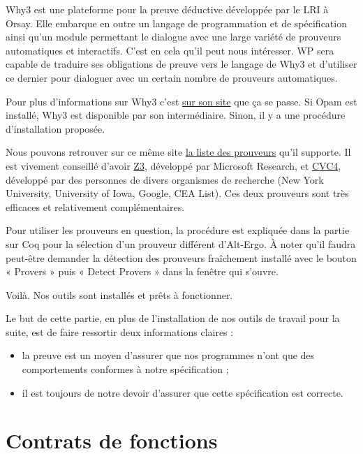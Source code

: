 \documentclass[12pt,francais,]{scrbook}
\providecommand{\tightlist}{%
  \setlength{\itemsep}{0pt}\setlength{\parskip}{0pt}}
\begin{document}
Why3 est une plateforme pour la preuve déductive développée par le LRI à
Orsay. Elle embarque en outre un langage de programmation et de
spécification ainsi qu'un module permettant le dialogue avec une large
variété de prouveurs automatiques et interactifs. C'est en cela qu'il
peut nous intéresser. WP sera capable de traduire ses obligations de
preuve vers le langage de Why3 et d'utiliser ce dernier pour dialoguer
avec un certain nombre de prouveurs automatiques.

Pour plus d'informations sur Why3 c'est \href{http://why3.lri.fr/}{sur
son site} que ça se passe. Si Opam est installé, Why3 est disponible par
son intermédiaire. Sinon, il y a une procédure d'installation proposée.

Nous pouvons retrouver sur ce même site
\href{http://why3.lri.fr/\#provers}{la liste des prouveurs} qu'il
supporte. Il est vivement conseillé d'avoir
\href{https://github.com/Z3Prover/z3/wiki}{Z3}, développé par Microsoft
Research, et \href{http://cvc4.cs.nyu.edu/web/}{CVC4}, développé par des
personnes de divers organismes de recherche (New York University,
University of Iowa, Google, CEA List). Ces deux prouveurs sont très
efficaces et relativement complémentaires.

Pour utiliser les prouveurs en question, la procédure est expliquée dans
la partie sur Coq pour la sélection d'un prouveur différent d'Alt-Ergo.
À noter qu'il faudra peut-être demander la détection des prouveurs
fraîchement installé avec le bouton « Provers » puis « Detect Provers »
dans la fenêtre qui s'ouvre.

Voilà. Nos outils sont installés et prêts à fonctionner.

Le but de cette partie, en plus de l'installation de nos outils de
travail pour la suite, est de faire ressortir deux informations claires
:

\begin{itemize}
\tightlist
\item
  la preuve est un moyen d'assurer que nos programmes n'ont que des
  comportements conformes à notre spécification ;
\item
  il est toujours de notre devoir d'assurer que cette spécification est
  correcte.
\end{itemize}

\chapter{Contrats de fonctions}\label{contrats-de-fonctions}
\end{document}
